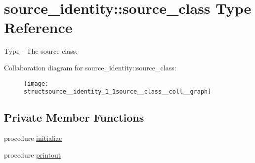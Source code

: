 \hypertarget{structsource__identity_1_1source__class}{}\section{source\+\_\+identity\+:\+:source\+\_\+class Type Reference}
\label{structsource__identity_1_1source__class}


Type -\/ The source class.  




Collaboration diagram for source\+\_\+identity\+:\+:source\+\_\+class\+:
\nopagebreak
\begin{figure}[H]
\begin{center}
\leavevmode
\texttt{[image: structsource\_\_identity\_1\_1source\_\_class\_\_coll\_\_graph]}
\end{center}
\end{figure}
\subsection*{Private Member Functions}
\begin{DoxyCompactItemize}
\item 
procedure \mbox{\hyperlink{structsource__identity_1_1source__class_af232e5b647bcb16f34dcc2f797ef7a95}{initialize}}
\item 
procedure \mbox{\hyperlink{structsource__identity_1_1source__class_ac9866a62bf8838665bb929deff5bce24}{printout}}
\end{DoxyCompactItemize}
